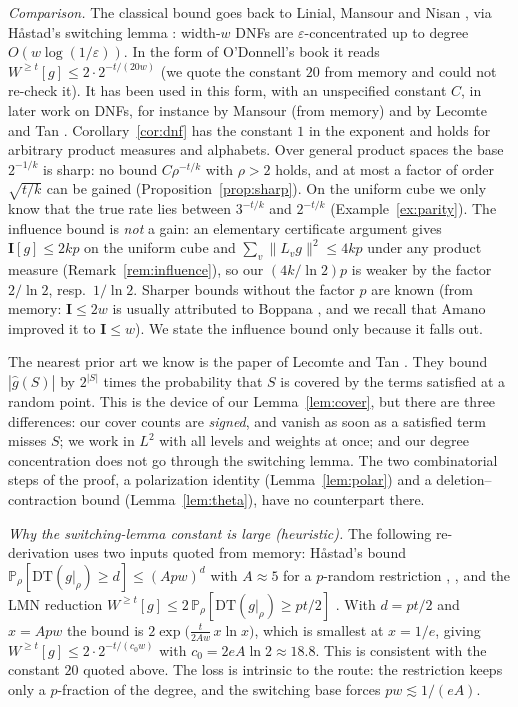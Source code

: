\documentclass[11pt,reqno]{amsart}
\theoremstyle{definition}
\newcommand{\PP}{\mathbb P}
\begin{document}
\emph{Comparison.}  The classical bound goes back to Linial, Mansour and Nisan
\cite{LMN}, via H{\aa}stad's switching lemma \cite{Hastad}: width-$w$ DNFs are
$\varepsilon$-concentrated up to degree $O(w\log(1/\varepsilon))$.  In the form of
O'Donnell's book \cite[\S4.4]{OD} it reads $W^{\ge t}[g]\le2\cdot2^{-t/(20w)}$
(we quote the constant $20$ from memory and could not re-check it).  It has
been used in this form, with an unspecified constant $C$, in later work on
DNFs, for instance by Mansour \cite{Mansour} (from memory) and by Lecomte
and Tan \cite[Fact~6]{LT}.  Corollary~\ref{cor:dnf} has the constant $1$ in the
exponent and holds for arbitrary product measures and alphabets.  Over
general product spaces the base $2^{-1/k}$ is sharp: no bound
$C\rho^{-t/k}$ with $\rho>2$ holds, and at most a factor of order $\sqrt{t/k}$
can be gained (Proposition~\ref{prop:sharp}).  On the uniform cube we only
know that the true rate lies between $3^{-t/k}$ and $2^{-t/k}$
(Example~\ref{ex:parity}).  The influence bound is \emph{not} a gain: an
elementary certificate argument gives $\mathbf I[g]\le2kp$ on the uniform cube
and $\sum_v\|L_vg\|^2\le4kp$ under any product measure
(Remark~\ref{rem:influence}), so our $(4k/\ln2)p$ is weaker by the factor
$2/\ln2$, resp.\ $1/\ln2$.  Sharper bounds without the factor $p$ are known
(from memory: $\mathbf I\le2w$ is usually attributed to Boppana \cite{Boppana},
and we recall that Amano \cite{Amano} improved it to $\mathbf I\le w$).  We state the
influence bound only because it falls out.

The nearest prior art we know is the paper of Lecomte and Tan \cite{LT}.
They bound $|\hat g(S)|$ by $2^{|S|}$ times the probability that $S$ is covered
by the terms satisfied at a random point.  This is the device of our
Lemma~\ref{lem:cover}, but there are three differences: our cover counts are
\emph{signed}, and vanish as soon as a satisfied term misses $S$; we work in
$L^2$ with all levels and weights at once; and our degree concentration does
not go through the switching lemma.  The two combinatorial steps of the proof,
a polarization identity (Lemma~\ref{lem:polar}) and a deletion--contraction
bound (Lemma~\ref{lem:theta}), have no counterpart there.

\emph{Why the switching-lemma constant is large (heuristic).}  The
following re-derivation uses two inputs quoted from memory: H{\aa}stad's
bound $\PP_\rho[\mathrm{DT}(g|_\rho)\ge d]\le(Apw)^d$ with $A\approx5$ for a $p$-random
restriction \cite{Hastad}, \cite[\S4.4]{OD}, and the LMN reduction
$W^{\ge t}[g]\le2\,\PP_\rho[\mathrm{DT}(g|_\rho)\ge pt/2]$ \cite{LMN}.  With $d=pt/2$ and
$x=Apw$ the bound is $2\exp\big(\tfrac{t}{2Aw}\,x\ln x\big)$, which is smallest at
$x=1/e$, giving $W^{\ge t}[g]\le2\cdot2^{-t/(c_0w)}$ with $c_0=2eA\ln2\approx18.8$.  This is
consistent with the constant $20$ quoted above.  The loss is intrinsic to
the route: the restriction keeps only a $p$-fraction of the degree, and the
switching base forces $pw\lesssim1/(eA)$.
\end{document}
